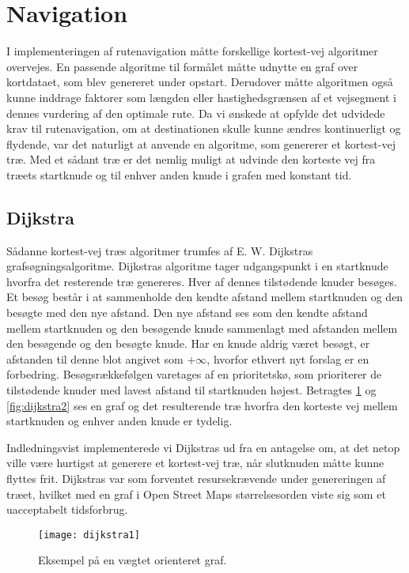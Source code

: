 \section{Navigation}
\label{sec:navigation}
I implementeringen af rutenavigation måtte forskellige kortest-vej algoritmer overvejes. En passende algoritme til formålet måtte udnytte en graf over kortdataet, som blev genereret under opstart. Derudover måtte algoritmen også kunne inddrage faktorer som længden eller hastighedsgrænsen af et vejsegment i dennes vurdering af den optimale rute. Da vi ønskede at opfylde det udvidede krav til rutenavigation, om at destinationen skulle kunne ændres kontinuerligt og flydende, var det naturligt at anvende en algoritme, som genererer et kortest-vej træ. Med et sådant træ er det nemlig muligt at udvinde den korteste vej fra træets startknude og til enhver anden knude i grafen med konstant tid.

\subsection{Dijkstra}
\label{subsec:dijkstra}
Sådanne kortest-vej træs algoritmer trumfes af E. W. Dijkstras grafsøgningsalgoritme. Dijkstras algoritme tager udgangspunkt i en startknude hvorfra det resterende træ genereres. Hver af dennes tilstødende knuder besøges. Et besøg består i at sammenholde den kendte afstand mellem startknuden og den besøgte med den nye afstand. Den nye afstand ses som den kendte afstand mellem startknuden og den besøgende knude sammenlagt med afstanden mellem den besøgende og den besøgte knude. Har en knude aldrig været besøgt, er afstanden til denne blot angivet som $+\infty$, hvorfor ethvert nyt forslag er en forbedring. Besøgsrækkefølgen varetages af en prioritetskø, som prioriterer de tilstødende knuder med lavest afstand til startknuden højest. Betragtes \ref{fig:dijkstra1} og \ref{fig:dijkstra2} ses en graf og det resulterende træ hvorfra den korteste vej mellem startknuden og enhver anden knude er tydelig.

Indledningsvist implementerede vi Dijkstras ud fra en antagelse om, at det netop ville være hurtigst at generere et kortest-vej træ, når slutknuden måtte kunne flyttes frit. Dijkstras var som forventet resursekrævende under genereringen af træet, hvilket med en graf i Open Street Maps størrelsesorden viste sig som et uacceptabelt tidsforbrug.

\begin{figure}[ht]
	\centering
  \texttt{[image: dijkstra1]}
  \captionsetup{width=0.8\textwidth}
  \caption{Eksempel på en vægtet orienteret graf.}
  \label{fig:dijkstra1}
\end{figure}

